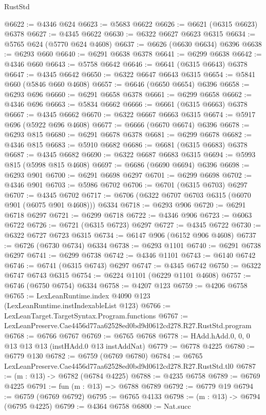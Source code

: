 \begin{lexlean}{RustStd}
\begin{coremodule}
@6622 := @4346 @624
@6623 := @5683 @6622
@6626 := @6621 (@6315 @6623) @6378
@6627 := @4345 @6622
@6630 := @6322 @6627 @6623 @6315
@6634 := @5765 @624 (@5770 @624 @4608)
@6637 := @6626 (@6630 @6634) @6396
@6638 := @6293 @660
@6640 := @6291 @6638 @6378
@6641 := @6299 @6638
@6642 := @4346 @660
@6643 := @5758 @6642
@6646 := @6641 (@6315 @6643) @6378
@6647 := @4345 @6642
@6650 := @6322 @6647 @6643 @6315
@6654 := @5841 @660 (@5846 @660 @4608)
@6657 := @6646 (@6650 @6654) @6396
@6658 := @6293 @696
@6660 := @6291 @6658 @6378
@6661 := @6299 @6658
@6662 := @4346 @696
@6663 := @5834 @6662
@6666 := @6661 (@6315 @6663) @6378
@6667 := @4345 @6662
@6670 := @6322 @6667 @6663 @6315
@6674 := @5917 @696 (@5922 @696 @4608)
@6677 := @6666 (@6670 @6674) @6396
@6678 := @6293 @815
@6680 := @6291 @6678 @6378
@6681 := @6299 @6678
@6682 := @4346 @815
@6683 := @5910 @6682
@6686 := @6681 (@6315 @6683) @6378
@6687 := @4345 @6682
@6690 := @6322 @6687 @6683 @6315
@6694 := @5993 @815 (@5998 @815 @4608)
@6697 := @6686 (@6690 @6694) @6396
@6698 := @6293 @901
@6700 := @6291 @6698 @6297
@6701 := @6299 @6698
@6702 := @4346 @901
@6703 := @5986 @6702
@6706 := @6701 (@6315 @6703) @6297
@6707 := @4345 @6702
@6717 := @6706 (@6322 @6707 @6703 @6315 (@6070 @901 (@6075 @901 @4608))) @6334
@6718 := @6293 @906
@6720 := @6291 @6718 @6297
@6721 := @6299 @6718
@6722 := @4346 @906
@6723 := @6063 @6722
@6726 := @6721 (@6315 @6723) @6297
@6727 := @4345 @6722
@6730 := @6322 @6727 @6723 @6315
@6734 := @6147 @906 (@6152 @906 @4608)
@6737 := @6726 (@6730 @6734) @6334
@6738 := @6293 @1101
@6740 := @6291 @6738 @6297
@6741 := @6299 @6738
@6742 := @4346 @1101
@6743 := @6140 @6742
@6746 := @6741 (@6315 @6743) @6297
@6747 := @4345 @6742
@6750 := @6322 @6747 @6743 @6315
@6754 := @6224 @1101 (@6229 @1101 @4608)
@6757 := @6746 (@6750 @6754) @6334
@6758 := @4207 @123
@6759 := @4206 @6758
@6765 := LexLeanRuntime.index @4090 @123 (LexLeanRuntime.instIndexableList @123)
@6766 := LexLeanTarget.TargetSyntax.Program.functions
@6767 := LexLeanPreserve.Cae4456d77aa62528ed0bd9d0612cd278.R27.RustStd.program
@6768 := @6766 @6767
@6769 := @6765 @6768
@6778 := HAdd.hAdd.{0, 0, 0} @13 @13 @13 (instHAdd.{0} @13 instAddNat)
@6779 := @6778 @4225
@6780 := @6779 @130
@6782 := @6759 (@6769 @6780)
@6784 := @6765 LexLeanPreserve.Cae4456d77aa62528ed0bd9d0612cd278.R27.RustStd.tl0
@6787 := (m : @13) -> @6782 (@6784 @4225)
@6788 := @4235 @6758
@6789 := @6769 @4225
@6791 := fun (m : @13) => @6788 @6789
@6792 := @6779 @19
@6794 := @6759 (@6769 @6792)
@6795 := @6765 @4133
@6798 := (m : @13) -> @6794 (@6795 @4225)
@6799 := @4364 @6758
@6800 := Nat.succ

\end{coremodule}
\end{lexlean}
